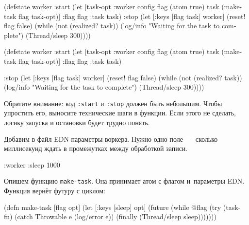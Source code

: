 \ifnarrow

\begin{english}
  \begin{clojure}
(defstate worker
  :start
  (let [{task-opt :worker} config
        flag (atom true)
        task (make-task flag task-opt)]
    {:flag flag :task task})
  :stop
  (let [{:keys [flag task]} worker]
    (reset! flag false)
    (while (not (realized? task))
      (log/info
      "Waiting for the task
                to complete")
      (Thread/sleep 300))))
  \end{clojure}
\end{english}

\else

\begin{english}
  \begin{clojure}
(defstate worker
  :start
  (let [{task-opt :worker} config
        flag (atom true)
        task (make-task flag task-opt)]
    {:flag flag :task task})

  :stop
  (let [{:keys [flag task]} worker]
    (reset! flag false)
    (while (not (realized? task))
      (log/info "Waiting for the task to complete")
      (Thread/sleep 300))))
  \end{clojure}
\end{english}

\fi

Обратите внимание: код \verb|:start| и \verb|:stop| должен быть небольшим. Чтобы
упростить его, выносите технические шаги в функции. Если этого не сделать,
логику запуска и остановки будет трудно понять.

Добавим в файл EDN параметры воркера. Нужно одно поле~--- сколько миллисекунд
ждать в промежутках между обработкой записи.

\begin{english}
  \begin{clojure}
{:worker {:sleep 1000}}
  \end{clojure}
\end{english}


\label{make-task}

Опишем функцию \verb|make-task|. Она принимает атом с флагом и~параметры
EDN. Функция вернёт футуру с циклом:

\pagebreaklarge

\ifnarrow

\begin{english}
  \begin{clojure/lines}
(defn make-task
  [flag opt]
  (let [{:keys [sleep]} opt]
    (future
      (while @flag
        (try
          (task-fn)
          (catch Throwable e
            (log/error e))
          (finally
            (Thread/sleep
              sleep)))))))
  \end{clojure/lines}
\end{english}

